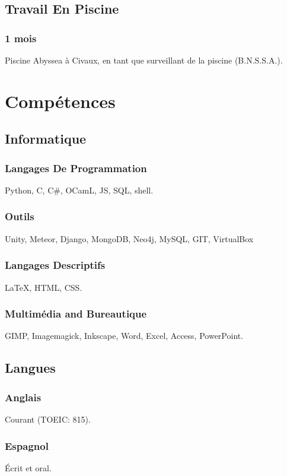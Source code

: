 \documentclass{article}
\begin{document}
\begin{multicols}{2}
            \subsection{Travail En Piscine}
                \subsubsection{1 mois}
                    Piscine Abyssea \`a Civaux, en tant que surveillant de la piscine  (B.N.S.S.A.).

        \columnbreak

        \section{Comp\'etences}
            \subsection{Informatique}
                \subsubsection{Langages De Programmation}
                    Python, C, C\#, OCamL, JS, SQL, shell.
                \subsubsection{Outils}
                    Unity, Meteor, Django,  MongoDB, Neo4j, MySQL, GIT, VirtualBox
                \subsubsection{Langages Descriptifs}
                    {\LaTeX}, HTML, CSS.
                \subsubsection{Multim\'edia and Bureautique}
                    GIMP, Imagemagick, Inkscape, Word, Excel, Access, PowerPoint.
            \subsection{Langues}
                \subsubsection{Anglais}
                    Courant (TOEIC: 815).
                \subsubsection{Espagnol}
                    \'Ecrit et oral.

\end{multicols}
\end{document}
